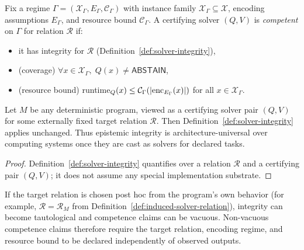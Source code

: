 \begin{definition}\label{def:competence-regime}
Fix a regime $\Gamma=(\mathcal{X}_\Gamma,E_\Gamma,\mathcal{C}_\Gamma)$ with instance family $\mathcal{X}_\Gamma\subseteq\mathcal{X}$, encoding assumptions $E_\Gamma$, and resource bound $\mathcal{C}_\Gamma$. A certifying solver $(Q,V)$ is \emph{competent} on $\Gamma$ for relation $\mathcal{R}$ if:
\begin{itemize}
\item it has integrity for $\mathcal{R}$ (Definition~\ref{def:solver-integrity}),
\item (coverage) $\forall x\in\mathcal{X}_\Gamma,\;Q(x)\neq\mathsf{ABSTAIN}$,
\item (resource bound) runtime$_Q(x)\le \mathcal{C}_\Gamma(|{\rm enc}_{E_\Gamma}(x)|)$ for all $x\in\mathcal{X}_\Gamma$.
\end{itemize}
\end{definition}

\begin{corollary}\label{cor:integrity-universal}
Let $M$ be any deterministic program, viewed as a certifying solver pair $(Q,V)$ for some externally fixed target relation $\mathcal{R}$.
Then Definition~\ref{def:solver-integrity} applies unchanged.
Thus epistemic integrity is architecture-universal over computing systems once they are cast as solvers for declared tasks.
\end{corollary}

\begin{proof}
Definition~\ref{def:solver-integrity} quantifies over a relation $\mathcal{R}$ and a certifying pair $(Q,V)$; it does not assume any special implementation substrate.
\end{proof}

\begin{remark}\label{rem:external-task-nonvacuity}
If the target relation is chosen post hoc from the program's own behavior (for example, $\mathcal{R}=\mathcal{R}_M$ from Definition~\ref{def:induced-solver-relation}), integrity can become tautological and competence claims can be vacuous.
Non-vacuous competence claims therefore require the target relation, encoding regime, and resource bound to be declared independently of observed outputs.
\end{remark}


